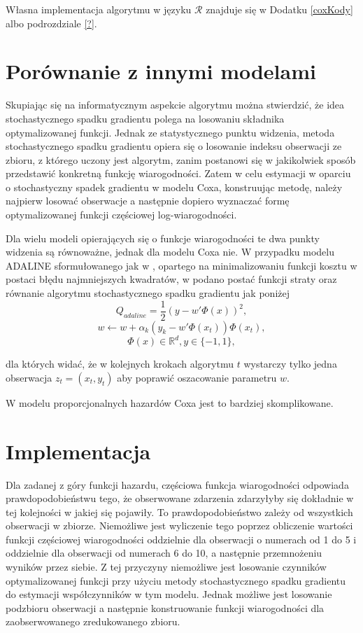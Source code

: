 Własna implementacja algorytmu w języku $\mathcal{R}$ znajduje się w Dodatku \ref{coxKody} albo podrozdziale \ref{?}.

\section{Porównanie z innymi modelami}

Skupiając się na informatycznym aspekcie algorytmu można stwierdzić, że idea stochastycznego spadku gradientu polega na losowaniu składnika optymalizowanej funkcji. Jednak ze statystycznego punktu widzenia, metoda stochastycznego spadku gradientu opiera się o losowanie indeksu obserwacji ze zbioru, z którego uczony jest algorytm, zanim postanowi się w jakikolwiek sposób przedstawić konkretną funkcję wiarogodności. Zatem w celu estymacji w oparciu o stochastyczny spadek gradientu w modelu Coxa, konstruując metodę, należy najpierw losować obserwacje a następnie dopiero wyznaczać formę optymalizowanej funkcji częściowej log-wiarogodności.

Dla wielu modeli opierających się o funkcje wiarogodności te dwa punkty widzenia są równoważne, jednak dla modelu Coxa nie. W przypadku modelu ADALINE sformułowanego jak w \cite{ADALINE2}, opartego na minimalizowaniu funkcji kosztu w postaci błędu najmniejszych kwadratów, w \cite{bott2} podano postać funkcji straty oraz równanie algorytmu stochastycznego spadku gradientu jak poniżej
$$Q_{adaline} = \frac{1}{2}(y-w'\varPhi(x))^2,$$ 
$$w \leftarrow w + \alpha_k(y_k-w'\varPhi(x_t))\varPhi(x_t),$$
$$\varPhi(x) \in \mathbb{R}^d, y \in \{-1,1\},$$

dla których widać, że w kolejnych krokach algorytmu $t$ wystarczy tylko jedna obserwacja $z_t=(x_t,y_t)$ aby poprawić oszacowanie parametru $w$.

W modelu proporcjonalnych hazardów Coxa jest to bardziej skomplikowane.

\section{Implementacja}

Dla zadanej z góry funkcji hazardu, częściowa funkcja wiarogodności odpowiada prawdopodobieństwu tego, że obserwowane zdarzenia zdarzyłyby się dokładnie w tej kolejności w jakiej się pojawiły. To prawdopodobieństwo zależy od wszystkich obserwacji w zbiorze. Niemożliwe jest wyliczenie tego poprzez obliczenie wartości funkcji częściowej wiarogodności oddzielnie dla obserwacji o numerach od 1 do 5 i oddzielnie dla obserwacji od numerach 6 do 10, a następnie przemnożeniu wyników przez siebie. Z tej przyczyny niemożliwe jest losowanie czynników optymalizowanej funkcji przy użyciu metody stochastycznego spadku gradientu do estymacji współczynników w tym modelu. Jednak możliwe jest losowanie podzbioru obserwacji a następnie konstruowanie funkcji wiarogodności dla zaobserwowanego zredukowanego zbioru.


